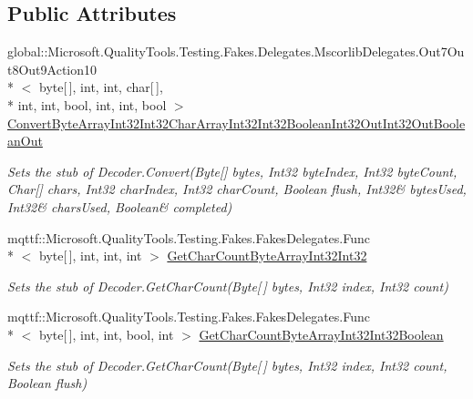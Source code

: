 \subsection*{Public Attributes}
\begin{DoxyCompactItemize}
\item 
global\-::\-Microsoft.\-Quality\-Tools.\-Testing.\-Fakes.\-Delegates.\-Mscorlib\-Delegates.\-Out7\-Out8\-Out9\-Action10\\*
$<$ byte\mbox{[}$\,$\mbox{]}, int, int, char\mbox{[}$\,$\mbox{]}, \\*
int, int, bool, int, int, bool $>$ \hyperlink{class_system_1_1_text_1_1_fakes_1_1_stub_decoder_afe5570f8b54582c99417473d74d4dbb4}{Convert\-Byte\-Array\-Int32\-Int32\-Char\-Array\-Int32\-Int32\-Boolean\-Int32\-Out\-Int32\-Out\-Boolean\-Out}
\begin{DoxyCompactList}\small\item\em Sets the stub of Decoder.\-Convert(Byte\mbox{[}\mbox{]} bytes, Int32 byte\-Index, Int32 byte\-Count, Char\mbox{[}\mbox{]} chars, Int32 char\-Index, Int32 char\-Count, Boolean flush, Int32\& bytes\-Used, Int32\& chars\-Used, Boolean\& completed)\end{DoxyCompactList}\item 
mqttf\-::\-Microsoft.\-Quality\-Tools.\-Testing.\-Fakes.\-Fakes\-Delegates.\-Func\\*
$<$ byte\mbox{[}$\,$\mbox{]}, int, int, int $>$ \hyperlink{class_system_1_1_text_1_1_fakes_1_1_stub_decoder_a75dba7227183044a41196cfa75f34a6f}{Get\-Char\-Count\-Byte\-Array\-Int32\-Int32}
\begin{DoxyCompactList}\small\item\em Sets the stub of Decoder.\-Get\-Char\-Count(\-Byte\mbox{[}$\,$\mbox{]} bytes, Int32 index, Int32 count)\end{DoxyCompactList}\item 
mqttf\-::\-Microsoft.\-Quality\-Tools.\-Testing.\-Fakes.\-Fakes\-Delegates.\-Func\\*
$<$ byte\mbox{[}$\,$\mbox{]}, int, int, bool, int $>$ \hyperlink{class_system_1_1_text_1_1_fakes_1_1_stub_decoder_ac0b9d7836839749ab30fb4506c8918cb}{Get\-Char\-Count\-Byte\-Array\-Int32\-Int32\-Boolean}
\begin{DoxyCompactList}\small\item\em Sets the stub of Decoder.\-Get\-Char\-Count(\-Byte\mbox{[}$\,$\mbox{]} bytes, Int32 index, Int32 count, Boolean flush)\end{DoxyCompactList}\item 

\end{DoxyCompactItemize}
